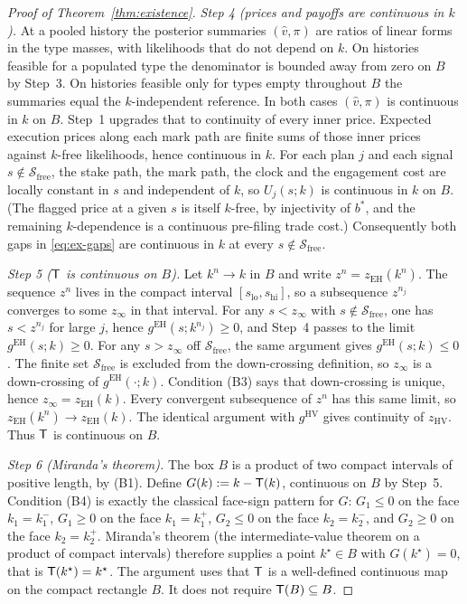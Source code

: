 \begin{proof}[Proof of Theorem~\ref{thm:existence}]
\emph{Step 4 (prices and payoffs are continuous in $k$).} At a pooled history the posterior
summaries $(\hat v,\pi)$ are ratios of linear forms in the type masses, with likelihoods that do not
depend on $k$. On histories feasible for a populated type the denominator is bounded away from zero
on $B$ by Step~3. On histories feasible only for types empty throughout $B$ the summaries equal the
$k$-independent reference. In both cases $(\hat v,\pi)$ is continuous in $k$ on $B$. Step~1 upgrades
that to continuity of every inner price. Expected execution prices along each mark path are finite
sums of those inner prices against $k$-free likelihoods, hence continuous in $k$. For each plan $j$
and each signal $s\notin\mathcal S_{\mathrm{free}}$, the stake path, the mark path, the clock and the
engagement cost are locally constant in $s$ and independent of $k$, so $U_j(s;k)$ is continuous in
$k$ on $B$. (The flagged price at a given $s$ is itself $k$-free, by injectivity of $b^*$,
and the remaining $k$-dependence is a continuous pre-filing trade cost.) Consequently both gaps in
\eqref{eq:ex-gaps} are continuous in $k$ at every $s\notin\mathcal S_{\mathrm{free}}$.

\emph{Step 5 ($\mathsf{T}$ is continuous on $B$).} Let $k^n\to k$ in $B$ and write
$z^n=z_{\mathrm{EH}}(k^n)$. The sequence $z^n$ lives in the compact interval
$[s_{\mathrm{lo}},s_{\mathrm{hi}}]$, so a subsequence $z^{n_j}$ converges to some
$z_\infty$ in that interval. For any $s<z_\infty$ with $s\notin\mathcal S_{\mathrm{free}}$, one has
$s<z^{n_j}$ for large $j$, hence $g^{\mathrm{EH}}(s;k^{n_j})\ge 0$, and Step~4 passes to the limit
$g^{\mathrm{EH}}(s;k)\ge 0$. For any $s>z_\infty$ off $\mathcal S_{\mathrm{free}}$, the same
argument gives $g^{\mathrm{EH}}(s;k)\le 0$. The finite set $\mathcal S_{\mathrm{free}}$ is excluded from the down-crossing definition, so
$z_\infty$ is a down-crossing of $g^{\mathrm{EH}}(\cdot;k)$. Condition (B3) says that
down-crossing is unique, hence $z_\infty=z_{\mathrm{EH}}(k)$. Every convergent subsequence of $z^n$ has this same limit, so
$z_{\mathrm{EH}}(k^n)\to z_{\mathrm{EH}}(k)$. The identical argument with $g^{\mathrm{HV}}$ gives
continuity of $z_{\mathrm{HV}}$. Thus $\mathsf{T}$ is continuous on $B$.

\emph{Step 6 (Miranda's theorem).} The box $B$ is a product of two compact intervals of positive
length, by (B1). Define $G(k):=k-\mathsf{T}(k)$, continuous on $B$ by Step~5. Condition (B4) is exactly
the classical face-sign pattern for $G$: $G_1\le 0$ on the face $k_1=k_1^-$, $G_1\ge 0$ on the face
$k_1=k_1^+$, $G_2\le 0$ on the face $k_2=k_2^-$, and $G_2\ge 0$ on the face $k_2=k_2^+$. Miranda's
theorem (the intermediate-value theorem on a product of compact intervals) therefore supplies a
point $k^\star\in B$ with $G(k^\star)=0$, that is $\mathsf{T}(k^\star)=k^\star$. The argument uses that
$\mathsf{T}$ is a well-defined continuous map on the compact rectangle $B$. It does not require
$\mathsf{T}(B)\subseteq B$.


\end{proof}
